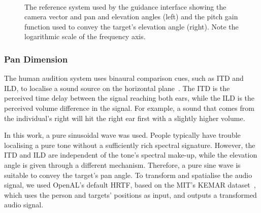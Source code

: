 \documentclass{article}
\begin{document}
\begin{figure}[t]
  \centering
~
  \caption{The reference system used by the guidance interface showing the camera vector and pan and elevation angles (left) and the pitch gain function used to convey the target's elevation angle (right). Note the logarithmic scale of the frequency axis.}
\end{figure}

\subsubsection{Pan Dimension}

The human audition system uses binaural comparison cues, such as ITD and ILD, to localise a sound source on the horizontal plane~\cite{blauert1969sound}.
The ITD is the perceived time delay between the signal reaching both ears, while the ILD is the perceived volume difference in the signal.
For example, a sound that comes from the individual's right will hit the right ear first with a slightly higher volume.

In this work, a pure sinusoidal wave was used. 
People typically have trouble localising a pure tone without a sufficiently rich spectral signature.
However, the ITD and ILD are independent of the tone's spectral make-up, while the elevation angle is given through a different mechanism. Therefore, a pure sine wave is suitable to convey the target's pan angle.
To transform and spatialise the audio signal, we used OpenAL's default HRTF, based on the MIT's KEMAR dataset~\cite{hiebert2005openal}, which uses the person and targets' positions as input, and outputs a transformed audio signal.
\end{document}
